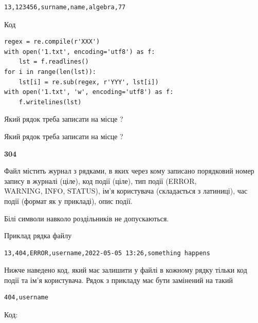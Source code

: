 \begin{verbatim}
13,123456,surname,name,algebra,77
\end{verbatim}




Код



\begin{verbatim}
regex = re.compile(r'XXX')
with open('1.txt', encoding='utf8') as f:
    lst = f.readlines()
for i in range(len(lst)):
    lst[i] = re.sub(regex, r'YYY', lst[i])
with open('1.txt', 'w', encoding='utf8') as f:
    f.writelines(lst)
\end{verbatim}







Який рядок треба записати на місце  ?\par
\vspace{5mm}


Який рядок треба записати на місце  ?\par


\newpage

{\begin {center}\textbf{ 304}\end {center}}\par
Файл  містить журнал з рядками, в яких через кому записано поряд\-ко\-вий номер запису в журналі (ціле), код події (ціле), тип події (ERROR, \\WARNING, INFO, STATUS), ім'я користувача (складається з латиниці), час події (фор\-мат як у прикладі), опис події.

Білі символи навколо роздільників не допускаються.

Приклад рядка файлу



\begin{verbatim}
13,404,ERROR,username,2022-05-05 13:26,something happens
\end{verbatim}


Нижче наведено код, який має залишити у файлі в кожному рядку тільки код події та ім'я користувача. Рядок з прикладу має бути замінений на такий



\begin{verbatim}
404,username
\end{verbatim}




Код:



